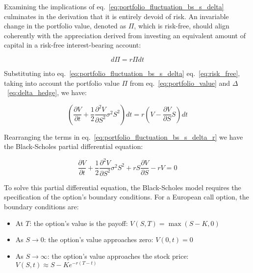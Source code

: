     Examining the implications of eq.~\ref{eq:portfolio_fluctuation_bs_s_delta} culminates in the derivation that
    it is entirely devoid of risk.
    An invariable change in the portfolio value, denoted as $\Pi$, which is risk-free, should align coherently with
    the appreciation derived from investing an equivalent amount of capital in a risk-free interest-bearing account:

    \begin{equation}
        d\Pi = r \Pi dt
        \label{eq:risk_free}
    \end{equation}

    Substituting into eq.~\ref{eq:portfolio_fluctuation_bs_s_delta} eq.~\ref{eq:risk_free}, taking into account the
    portfolio value $\Pi$ from eq.~\ref{eq:portfolio_value} and $\Delta$~\ref{eq:delta_hedge}, we have:

    \begin{equation}
        \left(
            \frac{\partial V}{\partial t}
            + \frac{1}{2} \frac{\partial^2 V}{\partial S^2} \sigma^2 S^2
        \right) dt
        = r \left( V - \frac{\partial V}{\partial S} S \right) dt
        \label{eq:portfolio_fluctuation_bs_s_delta_r}
    \end{equation}

    Rearranging the terms in eq.~\ref{eq:portfolio_fluctuation_bs_s_delta_r} we have the Black-Scholes partial
    differential equation:

    \begin{equation}
        \frac{\partial V}{\partial t}
        + \frac{1}{2} \frac{\partial^2 V}{\partial S^2} \sigma^2 S^2
        + r S \frac{\partial V}{\partial S}
        - r V = 0
        \label{eq:black_scholes}
    \end{equation}

    To solve this partial differential equation, the Black-Scholes model requires the specification of the option's
    boundary conditions.
    For a European call option, the boundary conditions are:
    \begin{itemize}
        \item At \textbf{$T$}: the option's value is the payoff: $V(S, T) = \max(S - K, 0)$
        \item As \textbf{$S \to 0$}: the option's value approaches zero: $V(0, t) = 0$
        \item As \textbf{$S \to \infty$}: the option's value approaches the stock price:
            $V(S, t) \approx S - Ke^{-r\left( T-t \right)}$
        \label{eq:boundary_conditions}
    \end{itemize}

